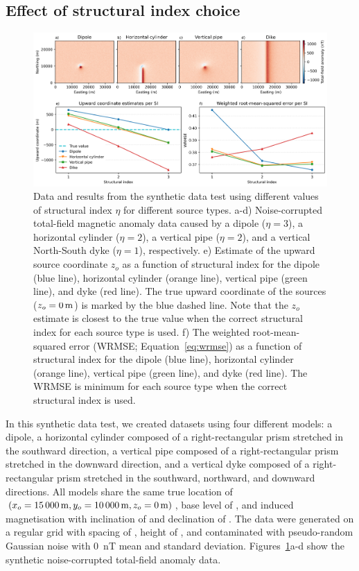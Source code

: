 \subsection{Effect of structural index choice}
\label{sec:si}

\begin{figure}[tb!]
\centering
\includegraphics[width=1\linewidth]{figures/synthetic-structural-index.png}
\caption{
    Data and results from the synthetic data test using different values of structural index $\eta$ for different source types.
    a-d) Noise-corrupted total-field magnetic anomaly data caused by a dipole ($\eta=3$), a horizontal cylinder ($\eta=2$), a vertical pipe ($\eta=2$), and a vertical North-South dyke ($\eta=1$), respectively.
    e) Estimate of the upward source coordinate $z_o$ as a function of structural index for the dipole (blue line), horizontal cylinder (orange line), vertical pipe (green line), and dyke (red line).
    The true upward coordinate of the sources ($z_o = \SynSITrueUp$) is marked by the blue dashed line. Note that the $z_o$ estimate is closest to the true value when the correct structural index for each source type is used.
    f) The weighted root-mean-squared error (WRMSE; Equation~\ref{eq:wrmse}) as a function of structural index for the dipole (blue line), horizontal cylinder (orange line), vertical pipe (green line), and dyke (red line). The WRMSE is minimum for each source type when the correct structural index is used.
}
\label{fig:si}
\end{figure}

In this synthetic data test, we created datasets using four different models: a dipole, a horizontal cylinder composed of a right-rectangular prism stretched in the southward direction, a vertical pipe composed of a right-rectangular prism stretched in the downward direction, and a vertical dyke composed of a right-rectangular prism stretched in the southward, northward, and downward directions.
All models share the same true location of $(x_o=\SynSITrueEast, y_o=\SynSITrueNorth, z_o=\SynSITrueUp)$, base level of \SynSITrueBase, and induced magnetisation with inclination of \SynSIInc{} and declination of \SynSIDec.
The data were generated on a regular grid with spacing of \SynSISpacing, height of \SynSIHeight, and contaminated with pseudo-random Gaussian noise with \qty{0}{\nano\tesla} mean and \SynSINoise{} standard deviation. Figures~\ref{fig:si}a-d show the synthetic noise-corrupted total-field anomaly data.

